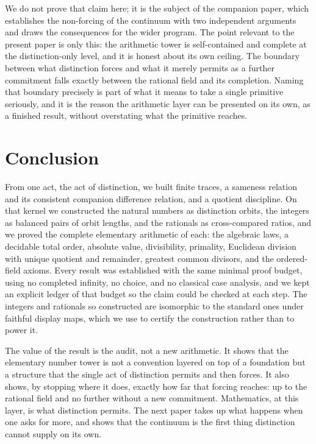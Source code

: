\documentclass[11pt,a4paper]{article}
\theoremstyle{definition}
\theoremstyle{remark}
\begin{document}
We do not prove that claim here; it is the subject of the companion paper, which
establishes the non-forcing of the continuum with two independent arguments and
draws the consequences for the wider program. The point relevant to the present
paper is only this: the arithmetic tower is self-contained and complete at the
distinction-only level, and it is honest about its own ceiling. The boundary
between what distinction forces and what it merely permits as a further
commitment falls exactly between the rational field and its completion. Naming
that boundary precisely is part of what it means to take a single primitive
seriously, and it is the reason the arithmetic layer can be presented on its own,
as a finished result, without overstating what the primitive reaches.

\section{Conclusion}\label{sec:conclusion}

From one act, the act of distinction, we built finite traces, a sameness
relation and its consistent companion difference relation, and a quotient
discipline. On that kernel we constructed the natural numbers as distinction
orbits, the integers as balanced pairs of orbit lengths, and the rationals as
cross-compared ratios, and we proved the complete elementary arithmetic of each:
the algebraic laws, a decidable total order, absolute value, divisibility,
primality, Euclidean division with unique quotient and remainder, greatest
common divisors, and the ordered-field axioms. Every result was established with
the same minimal proof budget, using no completed infinity, no choice, and no
classical case analysis, and we kept an explicit ledger of that budget so the
claim could be checked at each step. The integers and rationals so constructed
are isomorphic to the standard ones under faithful display maps, which we use to
certify the construction rather than to power it.

The value of the result is the audit, not a new arithmetic. It shows that the
elementary number tower is not a convention layered on top of a foundation but a
structure that the single act of distinction permits and then forces. It also
shows, by stopping where it does, exactly how far that forcing reaches: up to
the rational field and no further without a new commitment. Mathematics, at this
layer, is what distinction permits. The next paper takes up what happens when
one asks for more, and shows that the continuum is the first thing distinction
cannot supply on its own.
\end{document}
